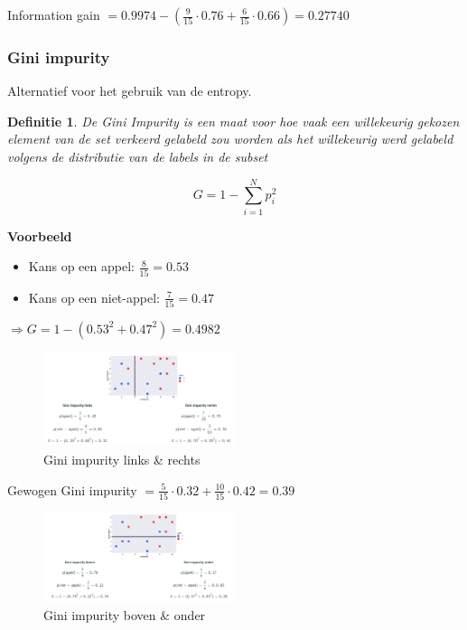 \documentclass{article}
\newtheorem{theorem}{Definitie}[section]
\begin{document}
Information gain $= 0.9974 - (\frac{9}{15} \cdot 0.76 + \frac{6}{15} \cdot 0.66) = 0.27740$

\subsubsection{Gini impurity}

Alternatief voor het gebruik van de entropy.

\begin{theorem}
    De Gini Impurity is een maat voor hoe vaak een willekeurig
    gekozen element van de set verkeerd gelabeld zou worden als het willekeurig werd gelabeld
    volgens de distributie van de labels in de subset
\end{theorem}

\begin{equation}
    G = 1 - \sum_{i=1}^N p_i^2
\end{equation}

\textbf{Voorbeeld}

\begin{itemize}
    \item Kans op een appel: $\frac{8}{15} = 0.53$
    \item Kans op een niet-appel: $\frac{7}{15} = 0.47$
\end{itemize}

$\Rightarrow G = 1 - (0.53^2 + 0.47^2) = 0.4982$

\begin{figure}[H]
    \centering
    \includegraphics[width=0.5\textwidth]{gini-impurity-1.png}
    \caption{Gini impurity links \& rechts}
\end{figure}

Gewogen Gini impurity $= \frac{5}{15} \cdot 0.32 + \frac{10}{15}\cdot 0.42 = 0.39$

\begin{figure}[H]
    \centering
    \includegraphics[width=0.5\textwidth]{gini-impurity-2.png}
    \caption{Gini impurity boven \& onder}
\end{figure}
\end{document}
